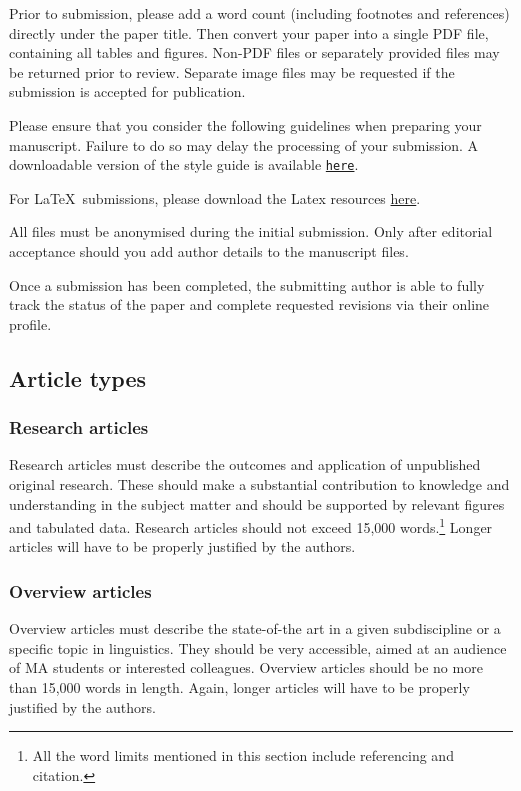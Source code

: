 \documentclass[charis,linguex]{glossa}
\begin{document}
Prior to submission, please add a word count (including footnotes and references) directly under the paper title. Then convert your paper into a single PDF file, containing all tables and figures. Non-PDF files or separately provided files may be returned prior to review. Separate image files may be requested if the submission is accepted for publication.

Please ensure that you consider the following guidelines when preparing your manuscript. Failure to do so may delay the processing of your submission. A downloadable version of the style guide is available \texttt{\href{https://www.glossa-journal.org/about/submissions/}{here}}. 

For \LaTeX\ submissions, please download the Latex resources \href{https://github.com/guidovw/Glossalatex}{here}.

All files must be anonymised during the initial submission. Only after editorial acceptance should you add author details to the manuscript files. 

Once a submission has been completed, the submitting author is able to fully track the status of the paper and complete requested revisions via their online profile.

\subsection{Article types}

\subsubsection{Research articles}

Research articles must describe the outcomes and application of unpublished original research. These should make a substantial contribution to knowledge and understanding in the subject matter and should be supported by relevant figures and tabulated data. Research articles should not exceed 15,000 words.\footnote{All the word limits mentioned in this section include referencing and citation.} Longer articles will have to be properly justified by the authors.

\subsubsection{Overview articles}

Overview articles must describe the state-of-the art in a given subdiscipline or a specific topic in linguistics. They should be very accessible, aimed at an audience of MA students or interested colleagues. Overview articles should be no more than 15,000 words in length. Again, longer articles will have to be properly justified by the authors.
\end{document}
